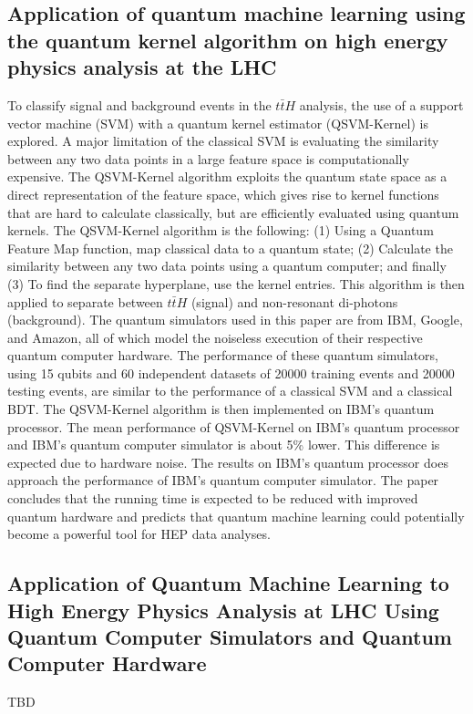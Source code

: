 \subsection{Application of quantum machine learning using the quantum kernel algorithm on high energy physics analysis at the LHC~\cite{Wu:2021xsj}}
To classify signal and background events in the $t\bar{t}H$ analysis, the use of a support vector machine (SVM) with a quantum kernel estimator (QSVM-Kernel) is explored. A major limitation of the classical SVM is evaluating the similarity between any two data points in a large feature space is computationally expensive. The QSVM-Kernel algorithm exploits the quantum state space as a direct representation of the feature space, which gives rise to kernel functions that are hard to calculate classically, but are efficiently evaluated using quantum kernels. The QSVM-Kernel algorithm is the following: (1) Using a Quantum Feature Map function, map classical data to a quantum state; (2) Calculate the similarity between any two data points using a quantum computer; and finally (3) To find the separate hyperplane, use the kernel entries. This algorithm is then applied to separate between $t\bar{t}H$ (signal) and non-resonant di-photons (background). The quantum simulators used in this paper are from IBM, Google, and Amazon, all of which model the noiseless execution of their respective quantum computer hardware. The performance of these quantum simulators, using 15 qubits and 60 independent datasets of 20000 training events and 20000 testing events, are similar to the performance of a classical SVM and a classical BDT. The QSVM-Kernel algorithm is then implemented on IBM's quantum processor. The mean performance of QSVM-Kernel on IBM's quantum processor and IBM's quantum computer simulator is about 5\% lower. This difference is expected due to hardware noise. The results on IBM's quantum processor does approach the performance of IBM's quantum computer simulator. The paper concludes that the running time is expected to be reduced with improved quantum hardware and predicts that quantum machine learning could potentially become a powerful tool for HEP data analyses.
\subsection{Application of Quantum Machine Learning to High Energy Physics Analysis at LHC Using Quantum Computer Simulators and Quantum Computer Hardware~\cite{Wu:2022tnc}}
TBD

